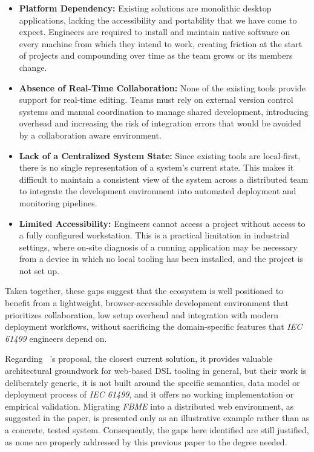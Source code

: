 \begin{itemize}
    \item \textbf{Platform Dependency:} Existing solutions are monolithic desktop applications, lacking the accessibility and portability that we have come to expect. Engineers are required to install and maintain native software on every machine from which they intend to work, creating friction at the start of projects and compounding over time as the team grows or its members change.

    \item \textbf{Absence of Real-Time Collaboration:} None of the existing tools provide support for real-time editing. Teams must rely on external version control systems and manual coordination to manage shared development, introducing overhead and increasing the risk of integration errors that would be avoided by a collaboration aware environment.

    \item \textbf{Lack of a Centralized System State:} Since existing tools are local-first, there is no single representation of a system's current state. This makes it difficult to maintain a consistent view of the system across a distributed team to integrate the development environment into automated deployment and monitoring pipelines.

    \item \textbf{Limited Accessibility:} Engineers cannot access a project without access to a fully configured workstation. This is a practical limitation in industrial settings, where on-site diagnosis of a running application may be necessary from a device in which no local tooling has been installed, and the project is not set up.
\end{itemize}

Taken together, these gaps suggest that the ecosystem is well positioned to benefit from a lightweight, browser-accessible development environment that prioritizes collaboration, low setup overhead and integration with modern deployment workflows, without sacrificing the domain-specific features that \textit{IEC 61499} engineers depend on.

Regarding \citeauthor{sorokin_towards_2023}\ \cite{sorokin_towards_2023}'s proposal, the closest current solution, it provides valuable architectural groundwork for web-based \ac{DSL} tooling in general, but their work is deliberately generic, it is not built around the specific semantics, data model or deployment process of \textit{IEC 61499}, and it offers no working implementation or empirical validation. Migrating \textit{FBME} into a distributed web environment, as suggested in the paper, is presented only as an illustrative example rather than as a concrete, tested system. Consequently, the gaps here identified are still justified, as none are properly addressed by this previous paper to the degree needed.
